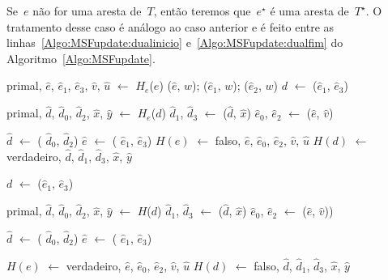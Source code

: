 Se~$e$ não for uma aresta de~$T$, então teremos que~$e^\star$ é uma aresta de~$T^\star$.
O tratamento desse caso é análogo ao caso anterior e é feito entre as linhas~\ref{Algo:MSFupdate:dualinicio} e~\ref{Algo:MSFupdate:dualfim} do Algoritmo~\ref{Algo:MSFupdate}.

\begin{algorithm}[htb]
\caption{\MSFupdate($G$, $e$, $w$)}
\label{Algo:MSFupdate}
\begin{algorithmic}[1]
\State primal, $\hat e$, $\hat e_1$, $\hat e_3$, $\hat v$, $\hat u$ $\gets$ $H_e$($e$)
\State \LCOAddCost($\hat e$, $w$); \LCOAddCost($\hat e_1$, $w$); \LCOAddCost($\hat e_2$, $w$)
\State $d$ $\gets$ \LCOMin($\hat e_1$, $\hat e_3$)\label{Algo:MSFupdate:linhamin}

\State primal, $\hat d$, $\hat d_0$, $\hat d_2$, $\hat x$, $\hat y$ $\gets$ $H_e$($d$)
\State $\hat d_1$, $\hat d_3$ $\gets$ \LCOSplit($\hat d$, $\hat x$)\label{Algo:MSFupdate:linhasplitd}
\State $\hat e_0$, $\hat e_2$ $\gets$ \LCOSplit($\hat e$, $\hat v$)\label{Algo:MSFupdate:linhasplite}


\State $\hat d$ $\gets$ \LCOMerge( $\hat d_0$, $\hat d_2$)\label{Algo:MSFupdate:linhas:Merged}
\State $\hat e$ $\gets$ \LCOMerge( $\hat e_1$, $\hat e_3$)\label{Algo:MSFupdate:linhas:Mergee}
\State $H(e)$ $\gets$ falso, $\hat e$, $\hat e_0$, $\hat e_2$, $\hat v$, $\hat u$
\State $H(d)$ $\gets$ verdadeiro, $\hat d$, $\hat d_1$, $\hat d_3$, $\hat x$, $\hat y$

\EndIf

\Else
\State $d$ $\gets$ \LCOMax($\hat e_1$, $\hat e_3$)\label{Algo:MSFupdate:dualinicio}

\State primal, $\hat d$, $\hat d_0$, $\hat d_2$, $\hat x$, $\hat y$ $\gets$ $H$($d$)
\State $\hat d_1$, $\hat d_3$ $\gets$ \LCOSplit($\hat d$, $\hat x$)
\State $\hat e_0$, $\hat e_2$ $\gets$ \LCOSplit($\hat e$, $\hat v$))

\State $\hat d$ $\gets$ \LCOMerge( $\hat d_0$, $\hat d_2$)
\State $\hat e$ $\gets$ \LCOMerge( $\hat e_1$, $\hat e_3$)

\State $H(e)$ $\gets$ verdadeiro, $\hat e$, $\hat e_0$, $\hat e_2$, $\hat v$, $\hat u$
\State $H(d)$ $\gets$ falso, $\hat d$, $\hat d_1$, $\hat d_3$, $\hat x$, $\hat y$

\EndIf
\EndIf\label{Algo:MSFupdate:dualfim}
\end{algorithmic}
\end{algorithm}


